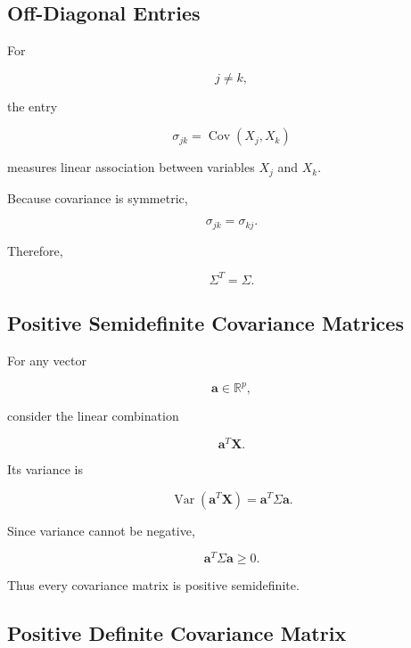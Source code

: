 \subsection{Off-Diagonal Entries}
\label{subsec:covariance-matrix-offdiagonal}

For

\[
j\neq k,
\]

the entry

\[
\boxed{
\sigma_{jk}
=
\operatorname{Cov}(X_j,X_k)
}
\]

measures linear association between variables \(X_j\) and \(X_k\).

Because covariance is symmetric,

\[
\boxed{
\sigma_{jk}
=
\sigma_{kj}.
}
\]

Therefore,

\[
\boxed{
\Sigma^T=\Sigma.
}
\]

\subsection{Positive Semidefinite Covariance Matrices}
\label{subsec:covariance-positive-semidefinite}

For any vector

\[
\mathbf{a}\in\mathbb{R}^p,
\]

consider the linear combination

\[
\mathbf{a}^T\mathbf{X}.
\]

Its variance is

\[
\boxed{
\operatorname{Var}
(
\mathbf{a}^T\mathbf{X}
)
=
\mathbf{a}^T
\Sigma
\mathbf{a}.
}
\]

Since variance cannot be negative,

\[
\boxed{
\mathbf{a}^T
\Sigma
\mathbf{a}
\geq0.
}
\]

Thus every covariance matrix is positive semidefinite.

\subsection{Positive Definite Covariance Matrix}
\label{subsec:positive-definite-covariance}

